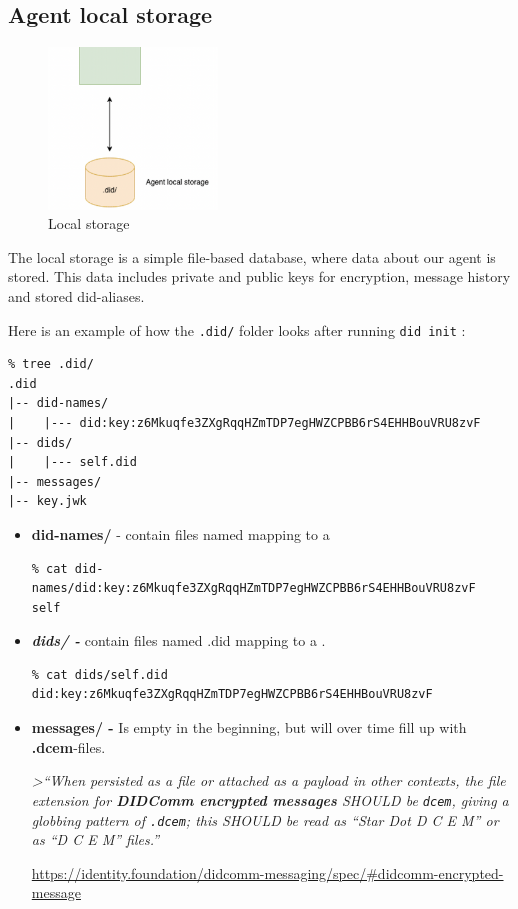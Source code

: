 \hypertarget{agent-local-storage}{%
\subsection{Agent local storage}\label{agent-local-storage}}

\begin{figure}
\centering
\includegraphics[width=0.4\textwidth]{Architecture 1442df162dbe45f4a423ba37d3e12363/Untitled 5.png}
\caption{Local storage}
\end{figure}

The local storage is a simple file-based database, where data about our
agent is stored. This data includes private and public keys for
encryption, message history and stored did-aliases.

Here is an example of how the \lstinline!.did/! folder
looks after running \lstinline!did init! :

\begin{lstlisting}
% tree .did/
.did
|-- did-names/
|    |--- did:key:z6Mkuqfe3ZXgRqqHZmTDP7egHWZCPBB6rS4EHHBouVRU8zvF
|-- dids/
|    |--- self.did
|-- messages/
|-- key.jwk
\end{lstlisting}

\begin{itemize}
\item
  \textbf{did-names/} - contain files named mapping to a

\begin{lstlisting}
% cat did-names/did:key:z6Mkuqfe3ZXgRqqHZmTDP7egHWZCPBB6rS4EHHBouVRU8zvF 
self
\end{lstlisting}
\item
  \textbf{\emph{dids/ -}} contain files named .did mapping to a .

\begin{lstlisting}
% cat dids/self.did  
did:key:z6Mkuqfe3ZXgRqqHZmTDP7egHWZCPBB6rS4EHHBouVRU8zvF
\end{lstlisting}
\item
  \textbf{messages/ -} Is empty in the beginning, but will over time
  fill up with \textbf{.dcem}-files.

  \emph{\textgreater{}``When persisted as a file or attached as a
  payload in other contexts, the file extension for \textbf{DIDComm
  encrypted messages} SHOULD be \lstinline!dcem!, giving a
  globbing pattern of \lstinline!.dcem!; this SHOULD be
  read as ``Star Dot D C E M'' or as ``D C E M'' files.''}

  \url{https://identity.foundation/didcomm-messaging/spec/\#didcomm-encrypted-message}
\end{itemize}



